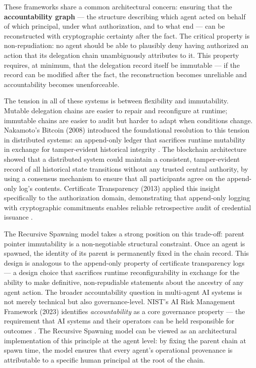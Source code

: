 These frameworks share a common architectural concern: ensuring that the \textbf{accountability graph} — the structure describing which agent acted on behalf of which principal, under what authorization, and to what end — can be reconstructed with cryptographic certainty after the fact. The critical property is non-repudiation: no agent should be able to plausibly deny having authorized an action that its delegation chain unambiguously attributes to it. This property requires, at minimum, that the delegation record itself be immutable — if the record can be modified after the fact, the reconstruction becomes unreliable and accountability becomes unenforceable.

The tension in all of these systems is between flexibility and immutability. Mutable delegation chains are easier to repair and reconfigure at runtime; immutable chains are easier to audit but harder to adapt when conditions change. Nakamoto's Bitcoin (2008) introduced the foundational resolution to this tension in distributed systems: an append-only ledger that sacrifices runtime mutability in exchange for tamper-evident historical integrity \cite{nakamoto2008bitcoin}. The blockchain architecture showed that a distributed system could maintain a consistent, tamper-evident record of all historical state transitions without any trusted central authority, by using a consensus mechanism to ensure that all participants agree on the append-only log's contents. Certificate Transparency (2013) applied this insight specifically to the authorization domain, demonstrating that append-only logging with cryptographic commitments enables reliable retrospective audit of credential issuance \cite{laurie2013certificate}.

The Recursive Spawning model takes a strong position on this trade-off: parent pointer immutability is a non-negotiable structural constraint. Once an agent is spawned, the identity of its parent is permanently fixed in the chain record. This design is analogous to the append-only property of certificate transparency logs — a design choice that sacrifices runtime reconfigurability in exchange for the ability to make definitive, non-repudiable statements about the ancestry of any agent action. The broader accountability question in multi-agent AI systems is not merely technical but also governance-level. NIST's AI Risk Management Framework (2023) identifies \textit{accountability} as a core governance property — the requirement that AI systems and their operators can be held responsible for outcomes \cite{nist2023}. The Recursive Spawning model can be viewed as an architectural implementation of this principle at the agent level: by fixing the parent chain at spawn time, the model ensures that every agent's operational provenance is attributable to a specific human principal at the root of the chain.

